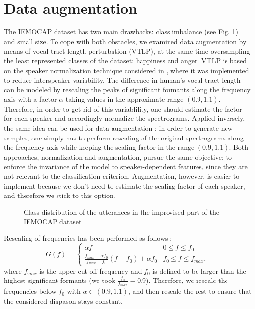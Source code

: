 \documentclass[a4paper]{article}
\newcommand{\beq}{\begin{equation}}
\newcommand{\eeq}{\end{equation}}
\begin{document}
\section{Data augmentation}

The IEMOCAP dataset has two main drawbacks: class imbalance (see Fig. \ref{fig:class-distribution}) and small size. 
To cope with both obstacles, we examined data augmentation by means of vocal tract length perturbation (VTLP), at the same time oversampling the least represented classes of 
the dataset: happiness and anger. VTLP is based on the speaker normalization technique considered in \cite{FWN}, where it was implemented to reduce interspeaker variability. The difference in human's vocal tract 
length can be modeled by rescaling the peaks of significant formants along the frequency axis with a factor $\alpha$ taking values in the approximate range $(0.9, 1.1)$.
Therefore, in order to get rid of this variablility, one should estimate the factor for each speaker and accordingly normalize the spectrograms. Applied inversely, the same idea 
can be used for data augmentation \cite{Jaitly2013VocalTL,IBMAUG, yerevan2016}: in order to generate new samples, one simply has to perform rescaling of the original spectrograms 
along the frequency axis while keeping the scaling factor in the range $(0.9, 1.1)$. Both approaches, normalization and augmentation, pursue the same objective: to enforce the 
invariance of the model to speaker-dependent features, since they are not relevant to the classification criterion. Augmentation, however, is easier to implement because we don't 
need to estimate the scaling factor of each speaker, and therefore we stick to this option.

\begin{figure}
     \centering
     \caption{Class distribution of the utterances in the improvised part of the IEMOCAP dataset}
     \label{fig:class-distribution}
\end{figure}


Rescaling of frequencies has been performed as follows \cite{FWN}:
\beq
G(f) =
\begin{cases}
   \alpha f & 0\leq f\leq f_0 \\
   \frac{f_{max} - \alpha f_0}{f_{max} - f_0}(f-f_0) + \alpha f_0 & f_0\leq f\leq f_{max},
 \end{cases}
\eeq
where $f_{max}$ is the upper cut-off frequency and $f_0$ is defined to be larger than the highest significant formants (we took $\frac{f_0}{f_{max}}=0.9$). 
Therefore, we rescale the frequencies below $f_0$ with $\alpha\in (0.9, 1.1)$, and then rescale the rest to ensure that the considered diapason stays constant. 
\end{document}

